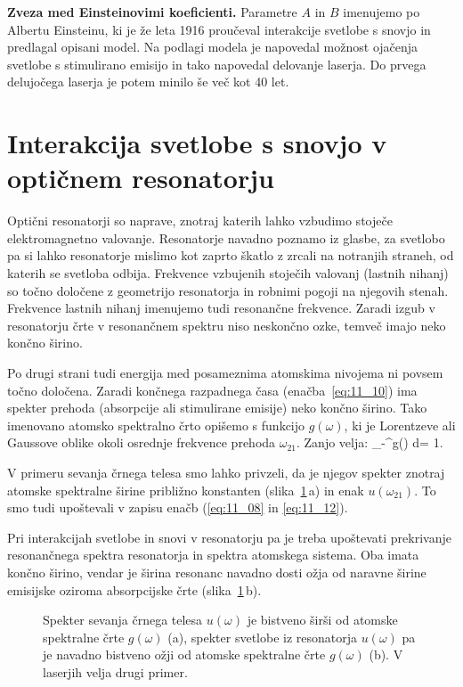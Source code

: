 \begin{example}{\bf Zveza med Einsteinovimi koeficienti.}
Parametre $A$ in $B$ imenujemo po Albertu Einsteinu, ki je že leta 1916
proučeval interakcije svetlobe s snovjo in predlagal opisani model. Na podlagi
modela je napovedal možnost ojačenja svetlobe s stimulirano emisijo in tako napovedal
delovanje laserja. Do prvega delujočega laserja je potem minilo še 
več kot 40 let. 
\end{example}

\section{Interakcija svetlobe s snovjo v optičnem resonatorju}
Optični resonatorji so naprave, znotraj katerih lahko vzbudimo 
stoječe elektromagnetno valovanje. Resonatorje navadno poznamo iz glasbe,
za svetlobo pa si lahko resonatorje mislimo kot zaprto škatlo
z zrcali na notranjih straneh, od katerih se svetloba odbija.
Frekvence vzbujenih stoječih valovanj (lastnih nihanj) so točno 
določene z geometrijo resonatorja in robnimi pogoji na njegovih stenah. 
Frekvence lastnih nihanj imenujemo tudi resonančne frekvence. 
Zaradi izgub v resonatorju črte v resonančnem spektru niso 
neskončno ozke, temveč imajo neko končno širino.

Po drugi strani tudi energija med posameznima atomskima nivojema 
ni povsem točno določena. Zaradi končnega razpadnega časa 
(enačba~\ref{eq:11_10}) ima spekter prehoda (absorpcije ali 
stimulirane emisije) neko končno širino. Tako imenovano
atomsko spektralno črto opišemo s funkcijo $g(\omega)$,
ki je Lorentzeve ali  Gaussove oblike okoli osrednje 
frekvence prehoda $\omega_{21}$. Zanjo velja:
\beq
\int_{-\infty}^\infty g(\omega) d\omega = 1.
\eeq

V primeru sevanja črnega telesa smo lahko privzeli, 
da je njegov spekter znotraj atomske spektralne širine 
približno konstanten (slika~\ref{fig:11_g}\,a) in enak $u(\omega_{21})$.
To smo tudi upoštevali v zapisu enačb (\ref{eq:11_08} in \ref{eq:11_12}). 

Pri interakcijah svetlobe in snovi v resonatorju pa je treba
upoštevati prekrivanje resonančnega spektra resonatorja in 
spektra atomskega sistema. Oba imata končno širino, vendar 
je širina resonanc navadno dosti ožja od naravne širine 
emisijske oziroma absorpcijske črte (slika~\ref{fig:11_g}\,b).
\begin{figure}[h!]
\centering
\def\svgwidth{120truemm} 

\caption{Spekter sevanja črnega telesa $u(\omega)$ je bistveno širši od atomske
spektralne črte $g(\omega)$ (a), spekter svetlobe iz resonatorja $u(\omega)$ pa je navadno
bistveno ožji od atomske spektralne črte $g(\omega)$ (b). V laserjih velja drugi primer.
}
\label{fig:11_g}
\end{figure}

